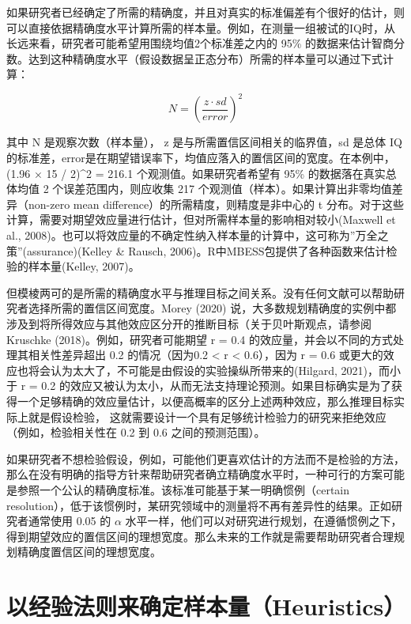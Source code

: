 \documentclass[
  letterpaper,
  DIV=11,
  numbers=noendperiod]{scrreprt}
\begin{document}
如果研究者已经确定了所需的精确度，并且对真实的标准偏差有个很好的估计，则可以直接依据精确度水平计算所需的样本量。例如，在测量一组被试的IQ时，从长远来看，研究者可能希望用围绕均值2个标准差之内的
95\%
的数据来估计智商分数。达到这种精确度水平（假设数据呈正态分布）所需的样本量可以通过下式计算：

\[N = \left(\frac{z \cdot sd}{error}\right)^2\]

其中 N 是观察次数（样本量）， z 是与所需置信区间相关的临界值，sd 是总体
IQ
的标准差，error是在期望错误率下，均值应落入的置信区间的宽度。在本例中，(1.96
× 15 / 2)\^{}2 = 216.1 个观测值。如果研究者希望有 95\%
的数据落在真实总体均值 2 个误差范围内，则应收集 217
个观测值（样本）。如果计算出非零均值差异（non-zero mean
difference）的所需精度，则精度是非中心的 t
分布。对于这些计算，需要对期望效应量进行估计，但对所需样本量的影响相对较小(Maxwell
et al.,
2008)。也可以将效应量的不确定性纳入样本量的计算中，这可称为''万全之策''(assurance)(Kelley
\& Rausch, 2006)。R中MBESS包提供了各种函数来估计检验的样本量(Kelley,
2007)。

但模棱两可的是所需的精确度水平与推理目标之间关系。没有任何文献可以帮助研究者选择所需的置信区间宽度。Morey
(2020)
说，大多数规划精确度的实例中都涉及到将所得效应与其他效应区分开的推断目标（关于贝叶斯观点，请参阅
Kruschke (2018)。例如，研究者可能期望 r = 0.4
的效应量，并会以不同的方式处理其相关性差异超出 0.2 的情况（因为0.2
\textless{} r \textless{} 0.6），因为 r = 0.6
或更大的效应也将会认为太大了，不可能是由假设的实验操纵所带来的(Hilgard,
2021)，而小于 r = 0.2
的效应又被认为太小，从而无法支持理论预测。如果目标确实是为了获得一个足够精确的效应量估计，以便高概率的区分上述两种效应，那么推理目标实际上就是假设检验，
这就需要设计一个具有足够统计检验力的研究来拒绝效应（例如，检验相关性在
0.2 到 0.6 之间的预测范围）。

如果研究者不想检验假设，例如，可能他们更喜欢估计的方法而不是检验的方法，那么在没有明确的指导方针来帮助研究者确立精确度水平时，一种可行的方案可能是参照一个公认的精确度标准。该标准可能基于某一明确惯例（certain
resolution），低于该惯例时，某研究领域中的测量将不再有差异性的结果。正如研究者通常使用
0.05 的 \(\alpha\)
水平一样，他们可以对研究进行规划，在遵循惯例之下，得到期望效应的置信区间的理想宽度。那么未来的工作就是需要帮助研究者合理规划精确度置信区间的理想宽度。

\hypertarget{ux4ee5ux7ecfux9a8cux6cd5ux5219ux6765ux786eux5b9aux6837ux672cux91cfheuristics}{%
\section{以经验法则来确定样本量（Heuristics）}\label{ux4ee5ux7ecfux9a8cux6cd5ux5219ux6765ux786eux5b9aux6837ux672cux91cfheuristics}}
\end{document}
